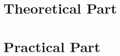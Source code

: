 \documentclass[12pt]{report}
\begin{document}
\tableofcontents

\newpage


\part{Theoretical Part}


\part{Practical Part}





\end{document}
